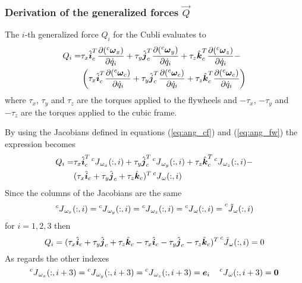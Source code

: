 \subsubsection{Derivation of the generalized forces $\vec{Q}$}
The $i$-th generalized force $Q_i$ for the Cubli evaluates to
\[
\begin{split}
  Q_i = & \tau_{x} \hat{\vec{i}}_c^{T} \frac{\partial (\prescript{c}{}{\vec{\omega}_x})}{\partial \dot{q}_i} +
  \tau_{y} \hat{\vec{j}}_c^{T} \frac{\partial (\prescript{c}{}{\vec{\omega}_y})}{\partial \dot{q}_i} +
  \tau_{z} \hat{\vec{k}}_c^{T} \frac{\partial (\prescript{c}{}{\vec{\omega}_z})}{\partial \dot{q}_i} -\\
  &\left( \tau_{x} \hat{\vec{i}}_c^{T} \frac{\partial (\prescript{c}{}{\vec{\omega}_c})}{\partial \dot{q}_i} +
  \tau_{y} \hat{\vec{j}}_c^{T} \frac{\partial (\prescript{c}{}{\vec{\omega}_c})}{\partial \dot{q}_i} +
  \tau_{z} \hat{\vec{k}}_c^{T} \frac{\partial (\prescript{c}{}{\vec{\omega}_c})}{\partial \dot{q}_i}\right)
\end{split}
\]
where $\tau_x$, $\tau_y$ and $\tau_z$ are the torques applied to the flywheels and
$-\tau_x$, $-\tau_y$ and $-\tau_z$ are the torques applied to the cubic frame.
\par
By using the Jacobians defined in equations (\ref{eq:ang_cf}) and (\ref{eq:ang_fw})
the expression becomes
\[
\begin{split}
  Q_i = & \tau_{x} \hat{\vec{i}}_c^{T} \prescript{c}{}{J}_{\omega_{x}}(:,i)+
  \tau_{y} \hat{\vec{j}}_c^{T} \prescript{c}{}{J}_{\omega_{y}}(:,i)+
  \tau_{z} \hat{\vec{k}}_c^{T} \prescript{c}{}{J}_{\omega_{z}}(:,i) -\\
  &( \tau_{x} \hat{\vec{i}}_c  +
  \tau_{y} \hat{\vec{j}}_c  +
  \tau_{z} \hat{\vec{k}}_c )^{T} \prescript{c}{}{J}_{\omega}(:,i)
\end{split}
\]
Since the columns of the Jacobians are the same
\[
\prescript{c}{}{J}_{\omega_{x}}(:,i) =
\prescript{c}{}{J}_{\omega_{y}}(:,i) =
\prescript{c}{}{J}_{\omega_{z}}(:,i) =
\prescript{c}{}{J}_{\omega}(:,i) =
\prescript{c}{}{\tilde{J}}_{\omega}(:,i)
\]
for $i = 1, 2, 3$ then
\[
Q_i = (\tau_{x} \hat{\vec{i}}_c  +
\tau_{y} \hat{\vec{j}}_c  +
\tau_{z} \hat{\vec{k}}_c  -
\tau_{x} \hat{\vec{i}}_c  -
\tau_{y} \hat{\vec{j}}_c  -
\tau_{z} \hat{\vec{k}}_c)^{T} \prescript{c}{}{\tilde{J}}_{\omega}(:,i) = 0
\]
As regards the other indexes
\[
\prescript{c}{}{J}_{\omega_{x}}(:,i + 3) =
\prescript{c}{}{J}_{\omega_{y}}(:,i + 3) =
\prescript{c}{}{J}_{\omega_{z}}(:,i + 3) =
\vec{e}_i
\quad
\prescript{c}{}{J}_{\omega}(:,i + 3) = \vec{0}
\]
